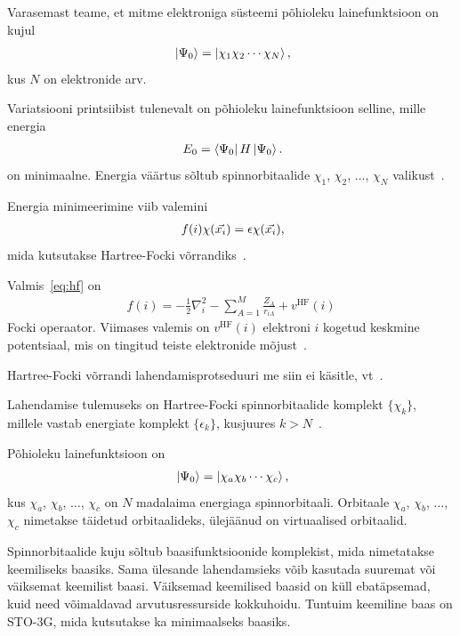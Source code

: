 \documentclass[12pt]{report}
\def\bra#1{\left<#1\right|}
\def\ket#1{\left|#1\right>}
\begin{document}
Varasemast teame, et mitme elektroniga süsteemi põhioleku lainefunktsioon on kujul
\begin{align}
    \ket{\Psi_0} = \ket{\chi_1 \chi_2 \cdots \chi_N} \rlap{,}
\end{align}
kus \(N\) on elektronide arv.

Variatsiooni printsiibist tulenevalt on põhioleku lainefunktsioon selline, mille energia
\begin{align}
    E_0 = \bra{\Psi_0} H \ket{\Psi_0} \rlap{.}
\end{align}
on minimaalne.
Energia väärtus sõltub spinnorbitaalide \(\chi_1\), \(\chi_2\), \(\ldots\), \(\chi_N\) valikust~\cite{szabo+ostlund}.

Energia minimeerimine viib valemini
\begin{align}\label{eq:hf}
    f(i) \chi(\vec{x_i}) = \epsilon \chi(\vec{x_i}) \rlap{,}
\end{align}
mida kutsutakse Hartree-Focki võrrandiks~\cite{szabo+ostlund}.

Valmis~\eqref{eq:hf} on
\begin{align}
    f(i) = -\frac{1}{2} \nabla_i^2 - \sum_{A = 1}^M \frac{Z_A}{r_{iA}} + v^\text{HF}(i)
\end{align}
Focki operaator.
Viimases valemis on \(v^\text{HF}(i)\) elektroni \(i\) kogetud keskmine potentsiaal, mis on tingitud teiste elektronide mõjust~\cite{szabo+ostlund}.

Hartree-Focki võrrandi lahendamisprotseduuri me siin ei käsitle, vt~\cite{szabo+ostlund}.

Lahendamise tulemuseks on Hartree-Focki spinnorbitaalide komplekt \(\{\chi_k\}\), millele vastab energiate komplekt \(\{\epsilon_k\}\), kusjuures \(k > N\)~\cite{szabo+ostlund}.

Põhioleku lainefunktsioon on
\begin{align}
    \ket{\Psi_0} = \ket{\chi_a \chi_b \cdots \chi_c} \rlap{,}
\end{align}
kus \(\chi_a\), \(\chi_b\), \(\ldots\), \(\chi_c\) on \(N\) madalaima energiaga spinnorbitaali.
Orbitaale \(\chi_a\), \(\chi_b\), \(\ldots\), \(\chi_c\) nimetakse täidetud orbitaalideks, ülejäänud on virtuaalised orbitaalid.

Spinnorbitaalide kuju sõltub baasifunktsioonide komplekist, mida nimetatakse keemiliseks baasiks.
Sama ülesande lahendamsieks võib kasutada suuremat või väiksemat keemilist baasi.
Väiksemad keemilised baasid on küll ebatäpsemad, kuid need võimaldavad arvutusressurside kokkuhoidu.
Tuntuim keemiline baas on STO-3G, mida kutsutakse ka minimaalseks baasiks.
\end{document}
